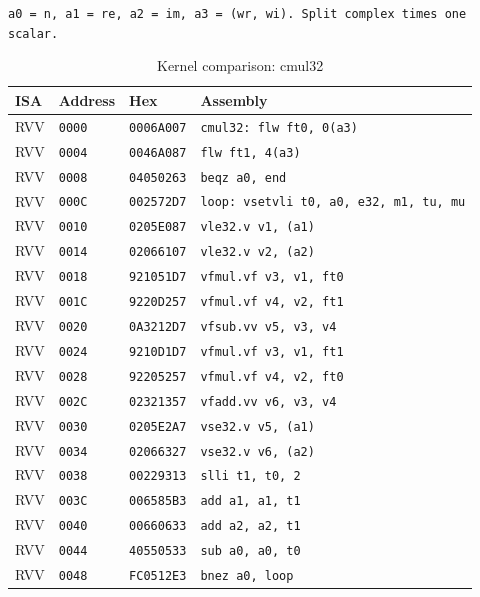 \begin{table}[htbp]
\centering
\caption{Kernel comparison: cmul32}
\begingroup
\scriptsize
\setlength{\tabcolsep}{4pt}
\noindent \texttt{a0 = n, a1 = re, a2 = im, a3 = (wr, wi). Split complex times one scalar.}\par
\vspace{0.6ex}
\begin{tabular}{@{}l|l|l|p{7.2cm}@{}}
\toprule
ISA & Address & Hex & Assembly \\
\midrule
RVV & \texttt{0000} & \texttt{0006A007} & \texttt{cmul32: flw ft0, 0(a3)} \\
RVV & \texttt{0004} & \texttt{0046A087} & \texttt{flw ft1, 4(a3)} \\
RVV & \texttt{0008} & \texttt{04050263} & \texttt{beqz a0, end} \\
RVV & \texttt{000C} & \texttt{002572D7} & \texttt{loop: vsetvli t0, a0, e32, m1, tu, mu} \\
RVV & \texttt{0010} & \texttt{0205E087} & \texttt{vle32.v v1, (a1)} \\
RVV & \texttt{0014} & \texttt{02066107} & \texttt{vle32.v v2, (a2)} \\
RVV & \texttt{0018} & \texttt{921051D7} & \texttt{vfmul.vf v3, v1, ft0} \\
RVV & \texttt{001C} & \texttt{9220D257} & \texttt{vfmul.vf v4, v2, ft1} \\
RVV & \texttt{0020} & \texttt{0A3212D7} & \texttt{vfsub.vv v5, v3, v4} \\
RVV & \texttt{0024} & \texttt{9210D1D7} & \texttt{vfmul.vf v3, v1, ft1} \\
RVV & \texttt{0028} & \texttt{92205257} & \texttt{vfmul.vf v4, v2, ft0} \\
RVV & \texttt{002C} & \texttt{02321357} & \texttt{vfadd.vv v6, v3, v4} \\
RVV & \texttt{0030} & \texttt{0205E2A7} & \texttt{vse32.v v5, (a1)} \\
RVV & \texttt{0034} & \texttt{02066327} & \texttt{vse32.v v6, (a2)} \\
RVV & \texttt{0038} & \texttt{00229313} & \texttt{slli t1, t0, 2} \\
RVV & \texttt{003C} & \texttt{006585B3} & \texttt{add a1, a1, t1} \\
RVV & \texttt{0040} & \texttt{00660633} & \texttt{add a2, a2, t1} \\
RVV & \texttt{0044} & \texttt{40550533} & \texttt{sub a0, a0, t0} \\
RVV & \texttt{0048} & \texttt{FC0512E3} & \texttt{bnez a0, loop} \\

\end{tabular}
\end{table}
